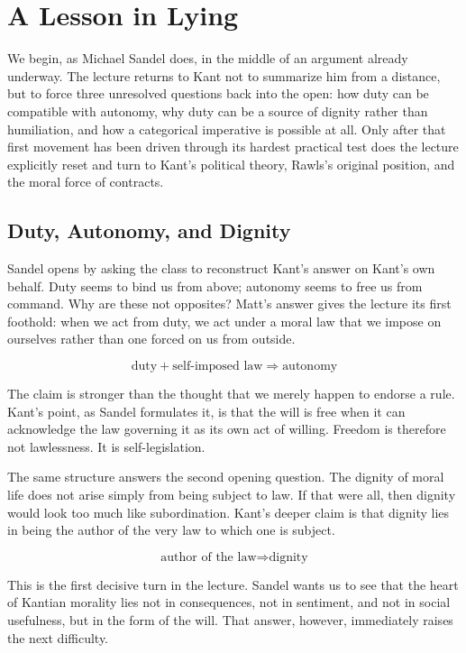 \chapter{A Lesson in Lying}

We begin, as Michael Sandel does, in the middle of an argument already underway. The lecture returns to Kant not to summarize him from a distance, but to force three unresolved questions back into the open: how duty can be compatible with autonomy, why duty can be a source of dignity rather than humiliation, and how a categorical imperative is possible at all. Only after that first movement has been driven through its hardest practical test does the lecture explicitly reset and turn to Kant's political theory, Rawls's original position, and the moral force of contracts.

\section{Duty, Autonomy, and Dignity}

Sandel opens by asking the class to reconstruct Kant's answer on Kant's own behalf. Duty seems to bind us from above; autonomy seems to free us from command. Why are these not opposites? Matt's answer gives the lecture its first foothold: when we act from duty, we act under a moral law that we impose on ourselves rather than one forced on us from outside.

\begin{equation}
\text{duty} + \text{self-imposed law} \Longrightarrow \text{autonomy}
\end{equation}

The claim is stronger than the thought that we merely happen to endorse a rule. Kant's point, as Sandel formulates it, is that the will is free when it can acknowledge the law governing it as its own act of willing. Freedom is therefore not lawlessness. It is self-legislation.

The same structure answers the second opening question. The dignity of moral life does not arise simply from being subject to law. If that were all, then dignity would look too much like subordination. Kant's deeper claim is that dignity lies in being the author of the very law to which one is subject.

\begin{equation}
\text{author of the law} \Longrightarrow \text{dignity}
\end{equation}

This is the first decisive turn in the lecture. Sandel wants us to see that the heart of Kantian morality lies not in consequences, not in sentiment, and not in social usefulness, but in the form of the will. That answer, however, immediately raises the next difficulty.

